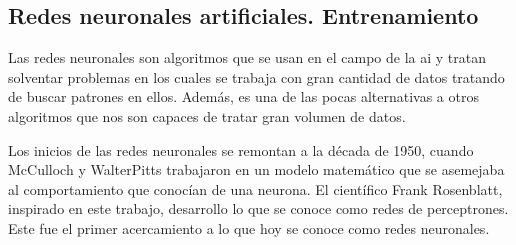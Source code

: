 \subsection{Redes neuronales artificiales. Entrenamiento}

Las redes neuronales son algoritmos que se usan en el campo de la \acrshort{ai} y tratan solventar problemas en los cuales se trabaja con gran cantidad de datos tratando de buscar patrones en ellos. Además, es una de las pocas alternativas a otros algoritmos que nos son capaces de tratar gran volumen de datos. 
\newline

Los inicios de las redes neuronales se remontan a la década de 1950, cuando McCulloch y WalterPitts\cite{kleene} trabajaron en un modelo matemático que se asemejaba al comportamiento que conocían de una neurona. El científico Frank Rosenblatt, inspirado en este trabajo, desarrollo lo que se conoce como redes de perceptrones. Este fue el primer acercamiento a lo que hoy se conoce como redes neuronales\cite{nielsen}. 








